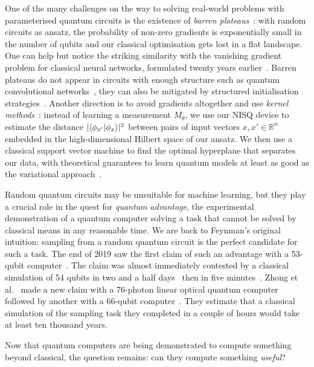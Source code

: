 One of the many challenges on the way to solving real-world problems with parameterised quantum circuits is the existence of \emph{barren plateaus}~\cite{McCleanEtAl18}:
with random circuits as ansatz, the probability of non-zero gradients is exponentially small in the number of qubits and our classical optimisation gets lost in a flat landscape.
One can help but notice the striking similarity with the vanishing gradient
problem for classical neural networks, formulated twenty years earlier~\cite{Hochreiter98}.
Barren plateaus do not appear in circuits with enough structure such as quantum convolutional networks~\cite{PesahEtAl21}, they can also be mitigated by structured initialisation strategies~\cite{GrantEtAl19}.
Another direction is to avoid gradients altogether and use \emph{kernel methods}~\cite{SchuldKilloran19}:
instead of learning a measurement $M_\theta$, we use our NISQ device to estimate the distance $|\langle\phi_{x'}|\phi_x\rangle|^2$ between pairs of input vectors $x, x' \in \mathbb{R}^n$ embedded in the high-dimensional Hilbert space of our ansatz.
We then use a classical support vector machine to find the optimal hyperplane that separates our data, with theoretical guarantees to learn quantum models at least as good as the variational approach~\cite{Schuld21}.

Random quantum circuits may be unsuitable for machine learning, but they play a crucial role in the quest for \emph{quantum advantage}, the experimental demonstration of a quantum computer solving a task that cannot be solved by classical means in any reasonable time.
We are back to Feynman's original intuition: sampling from a random quantum circuit is the perfect candidate for such a task.
The end of 2019 saw the first claim of such an advantage with a 53-qubit computer~\cite{AruteEtAl19}.
The claim was almost immediately contested by a classical simulation of 54 qubits in two and a half days~\cite{PednaultEtAl19} then in five minutes~\cite{YongEtAl21}.
Zhong et al.~\cite{ZhongEtAl20} made a new claim with a 76-photon linear optical quantum computer followed by another with a 66-qubit computer~\cite{WuEtAl21,ZhuEtAl21}.
They estimate that a classical simulation of the sampling task they completed in a couple of hours would take at least ten thousand years.

Now that quantum computers are being demonstrated to compute something beyond classical, the question remains: can they compute something \emph{useful}?
